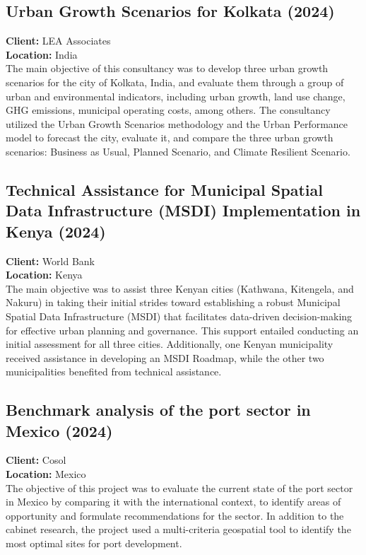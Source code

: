 \documentclass[
	a4paper,
	12pt,
	unnumberedsections,
]{CSSullivanBusinessReport}
\begin{document}
\subsection{Urban Growth Scenarios for Kolkata (2024)}
\textbf{Client:}  LEA Associates  \\
\textbf{Location:}  India \\[0.5em]
 The main objective of this consultancy was to develop three urban growth scenarios for the city of Kolkata, India, and evaluate them through a group of urban and environmental indicators, including urban growth, land use change, GHG emissions, municipal operating costs, among others. The consultancy utilized the Urban Growth Scenarios methodology and the Urban Performance model to forecast the city, evaluate it, and compare the three urban growth scenarios: Business as Usual, Planned Scenario, and Climate Resilient Scenario.

\subsection{Technical Assistance for Municipal Spatial Data Infrastructure (MSDI) Implementation in Kenya (2024)}
\textbf{Client:}   World Bank \\
\textbf{Location:}  Kenya \\[0.5em]
 The main objective was to assist three Kenyan cities (Kathwana, Kitengela, and Nakuru) in taking their initial strides toward establishing a robust Municipal Spatial Data Infrastructure (MSDI) that facilitates data-driven decision-making for effective urban planning and governance. This support entailed conducting an initial assessment for all three cities. Additionally, one Kenyan municipality received assistance in developing an MSDI Roadmap, while the other two municipalities benefited from technical assistance.

\subsection{Benchmark analysis of the port sector in Mexico (2024)}
\textbf{Client:}  Cosol  \\
\textbf{Location:}  Mexico \\[0.5em]
 The objective of this project was to evaluate the current state of the port sector in Mexico by comparing it with the international context, to identify areas of opportunity and formulate recommendations for the sector. In addition to the cabinet research, the project used a multi-criteria geospatial tool to identify the most optimal sites for port development.
\end{document}
